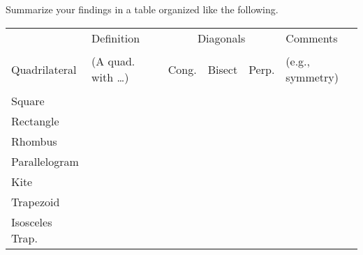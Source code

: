 \documentclass[nooutcomes]{ximera}
\begin{document}
\newpage
\begin{problem}
Summarize your findings in a table organized like the following.  
{
\renewcommand\arraystretch{2.8}
\renewcommand\tabcolsep{12pt}
\begin{table}[h]
\begin{tabular}{|l|p{4cm}|c|c|c|p{4cm}|}
\hline 
 & Definition  & \multicolumn{3}{c|}{Diagonals} &  Comments \\  %
Quadrilateral & (A quad. with \dots) & \begin{sideways}Cong.\end{sideways} & 
\begin{sideways}Bisect\end{sideways} & \begin{sideways}Perp.\end{sideways} & (e.g., symmetry) \\ \hline\hline
Square           &            &   &  &         &                  \\  \hline
Rectangle       &           &   &  &         &                  \\ \hline
Rhombus        &           &   &  &         &                  \\ \hline
Parallelogram &           &   &  &         &                  \\ \hline
Kite                &           &   &  &          &                  \\ \hline
Trapezoid       &           &   &  &         &                  \\ \hline
Isosceles Trap.       &           &   &  &         &                  \\ \hline
\end{tabular}
\end{table}
}
\end{problem}
\end{document}
